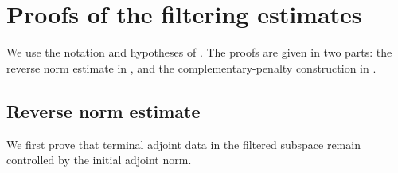 \documentclass[print,wide,eng]{draft}
\begin{document}
\section{Proofs of the filtering estimates}\label{sec:filter-proofs}

We use the notation and hypotheses of . The proofs are given in two parts: the reverse norm estimate in , and the complementary-penalty construction in .

\subsection{Reverse norm estimate}\label{sec:filter-reverse-proof}

We first prove that terminal adjoint data in the filtered subspace remain controlled by the initial adjoint norm.
%
\end{document}
